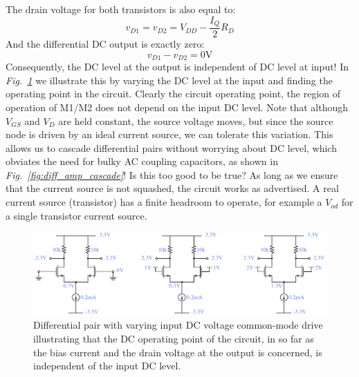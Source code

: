 The drain voltage for both transistors is also equal to:
    \begin{equation}
        {v_{D1}} = {v_{D2}} = {V_{DD}} - \frac{I_Q}{2}{R_D}  
    \end{equation}
And the differential DC output is exactly zero:
    \begin{equation}
        {v_{D1}} - {v_{D2}} = 0\mathrm{V}
    \end{equation}
Consequently, the DC level at the output is independent of DC level at input! In \emph{Fig.~\ref{fig:diff_amp_bias_cm.pdf}} we illustrate this by varying the DC level at the input and finding the operating point in the circuit.  Clearly the circuit operating point, the region of operation of M1/M2 does not depend on the input DC level.  Note that although $V_{GS}$ and $V_{D}$ are held constant, the source voltage moves, but since the source node is driven by an ideal current source, we can tolerate this variation.  This allows us to cascade differential pairs without worrying about DC level, which obviates the need for bulky AC coupling capacitors, as shown in \emph{Fig.~\ref{fig:diff_amp_cascade}}! Is this too good to be true?  As long as we ensure that the current source is not squashed, the circuit works as advertised.  A real current source (transistor) has a finite headroom to operate, for example a $V_{od}$ for a single transistor current source.
\begin{figure}[tb]
\centering
\includegraphics[width=\columnwidth]{diff_amp_bias_cm.pdf}
\caption{Differential pair with varying input DC voltage common-mode drive illustrating that the DC operating point of the circuit, in so far as the bias current and the drain voltage at the output is concerned, is independent of the input DC level.}
\label{fig:diff_amp_bias_cm.pdf}
\end{figure}
